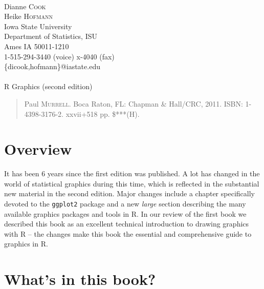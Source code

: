 \documentclass[12pt]{article}
\begin{document}
\noindent [Reviewers]\\ 
Dianne \textsc{Cook} \\ 
Heike \textsc{Hofmann} \\ 
Iowa State University \\ 
Department of Statistics, ISU \\ 
Ames IA 50011-1210 \\ 
1-515-294-3440 (voice) x-4040 (fax) \\ 
\{dicook,hofmann\}@iastate.edu \\ 

\noindent [Book \#***]\\ 
{\Large\sf R Graphics (second edition)}
\begin{quotation}\noindent
 Paul \textsc{Murrell}.  
Boca Raton, FL: Chapman \& Hall/CRC, 2011.  ISBN: 1-4398-3176-2. xxvii+518 pp. \$***(H).  
\end{quotation}\vspace{12pt}

\setlength{\baselineskip}{20pt}

\section{Overview}

It has been 6 years since the first edition was published. A lot has
changed in the world of statistical graphics during this time, which
is reflected in the substantial new material in the second
edition. Major changes include a chapter specifically devoted to the
\texttt{ggplot2} package and a new {\em large} section describing the
many available graphics packages and tools in R.  In our
review of the first book we described this book as an excellent
technical introduction to drawing graphics with R -- the changes make
this book the essential and comprehensive guide to graphics in R.



\section{What's in this book?}
\end{document}
